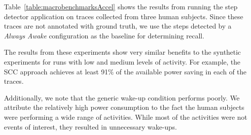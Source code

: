 Table~\ref{table:macrobenchmarksAccel} shows the results from running the
step detector application on traces collected from three human
subjects.  Since these traces are not annotated with ground truth, we
use the steps detected by a {\em Always Awake} configuration as the baseline for
determining recall.

The results from these experiments show very similar
benefits to the synthetic experiments for runs with low and medium
levels of activity.  For example, the SCC approach achieves
at least 91\% of the available power saving in each of the traces.  

Additionally, we note that the generic wake-up condition performs poorly.  We 
attribute the relatively high power consumption to the fact the human subjects 
were performing a wide range of activities.  While most of the activities were 
not events of interest, they resulted in unnecessary wake-ups.

